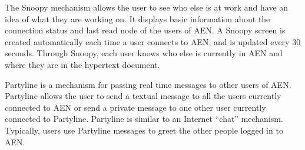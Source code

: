 The Snoopy mechanism allows the user to see who else is at work and have an
idea of what they are working on.  It displays basic information about the
connection status and last read node of the users of AEN.  A Snoopy screen
is created automatically each time a user connects to AEN, and is updated
every 30 seconds.  Through Snoopy, each user knows who else is currently in
AEN and where they are in the hypertext document.

Partyline is a mechanism for passing real time messages to other users of
AEN.  Partyline allows the user to send a textual message to all the users
currently connected to AEN or send a private message to one other user
currently connected to Partyline.  Partyline is similar to an Internet
``chat'' mechanism.  Typically, users use Partyline messages to greet the
other people logged in to AEN.







